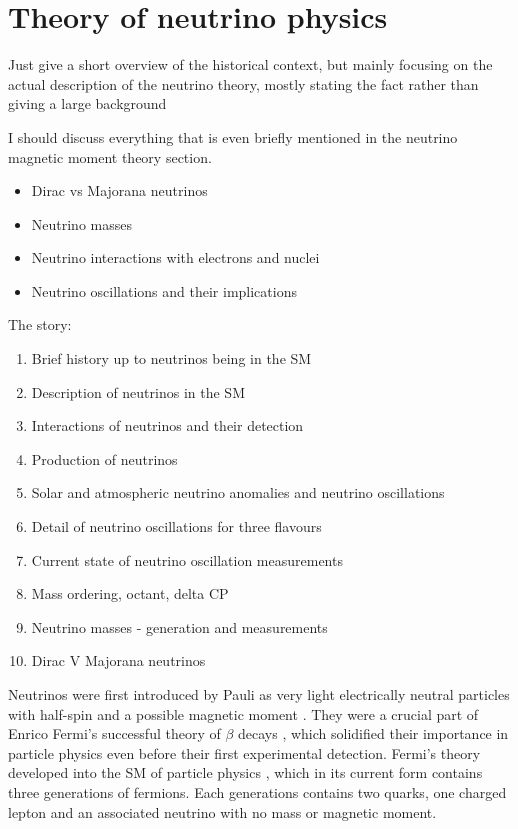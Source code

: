 \chapter{Theory of neutrino physics}\label{sec:NeutrinoTheory}

Just give a short overview of the historical context, but mainly focusing on the actual description of the neutrino theory, mostly stating the fact rather than giving a large background

I should discuss everything that is even briefly mentioned in the neutrino magnetic moment theory section.
\begin{itemize}
\item Dirac vs Majorana neutrinos
\item Neutrino masses
\item Neutrino interactions with electrons and nuclei
\item Neutrino oscillations and their implications
\end{itemize}

The story:
\begin{enumerate}
\item Brief history up to neutrinos being in the SM
\item Description of neutrinos in the SM
\item Interactions of neutrinos and their detection
\item Production of neutrinos
\item Solar and atmospheric neutrino anomalies and neutrino oscillations
\item Detail of neutrino oscillations for three flavours
\item Current state of neutrino oscillation measurements
\item Mass ordering, octant, delta CP
\item Neutrino masses - generation and measurements
\item Dirac V Majorana neutrinos
\end{enumerate}


Neutrinos were first introduced by Pauli \cite{PauliNeutrinoProposalLetter.pdf,TheIdeaOfTheNeutrino.pdf} as very light electrically neutral particles with half-spin and a possible magnetic moment \cite{NeutrinoMagMomentImplications1934.pdf}. They were a crucial part of Enrico Fermi's successful theory of $\beta$ decays \cite{FermisTheoryOfBetaDecayOriginal.pdf, FermisTheoryOfBetaDecay.pdf}, which solidified their importance in particle physics even before their first experimental detection.
Fermi's theory developed into the \gls{SM} of particle physics \cite{SMGlashow.pdf,SMWeinberg.pdf,SMSalam.pdf}, which in its current form contains three generations of fermions. Each generations contains two quarks, one charged lepton and an associated neutrino with no mass or magnetic moment. 

